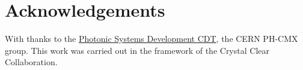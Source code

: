 \section*{Acknowledgements}
With thanks to the \href{https://www.photonicsystems.org/}{Photonic Systems Development CDT}, the CERN PH-CMX group. This work was carried out in the framework of the Crystal Clear Collaboration. 